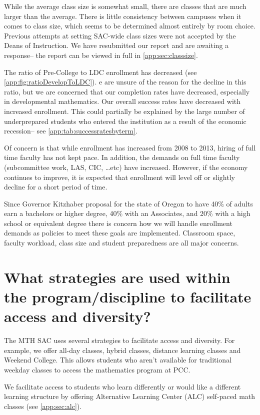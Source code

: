 While the average class size is somewhat small, there are classes that are much larger than the average. There is little consistency between campuses when it comes to class size, which seems to be determined almost entirely by room choice. Previous attempts at setting SAC-wide class sizes were not accepted by the Deans of Instruction. We have resubmitted our report and are awaiting a response-- the report can be viewed in full in \vref{app:sec:classsize}.

The ratio of Pre-College to LDC enrollment has decreased (see \vref{app:fig:ratioDevelopToLDC}). e are unsure of the reason for the decline in this ratio, but we are concerned that our completion rates have decreased, especially in developmental mathematics. Our overall success rates have decreased with increased enrollment.  This could partially be explained by the large number of underprepared students who entered the institution as a result of the economic recession-- see \vref{app:tab:successratesbyterm}.

Of concern is that while enrollment has increased from 2008 to 2013, hiring of full time faculty has not kept pace. In addition, the demands on full time faculty (subcommittee work, LAS, CIC, \ldots etc) have increased.   However, if the economy continues to improve, it is expected that enrollment will level off or slightly decline for a short period of time.

Since Governor Kitzhaber proposal for the state of Oregon to have 40\% of adults earn a bachelors or higher degree, 40\% with an Associates, and 20\% with a high school or equivalent degree there is concern how we will handle enrollment demands as policies to meet these goals are implemented.    Classroom space, faculty workload, class size and student preparedness are all major concerns.

\section{What strategies are used within the program/discipline to facilitate access and diversity?}
The MTH SAC uses several strategies to facilitate access and diversity. For example, we offer all-day classes, hybrid classes, distance learning classes and Weekend College. This allows students who aren't available for traditional weekday classes to access the mathematics program at PCC. 

We facilitate access to students who learn differently or would like a different learning structure by offering  Alternative Learning Center (ALC) self-paced math classes (see \vref{app:sec:alc}).

